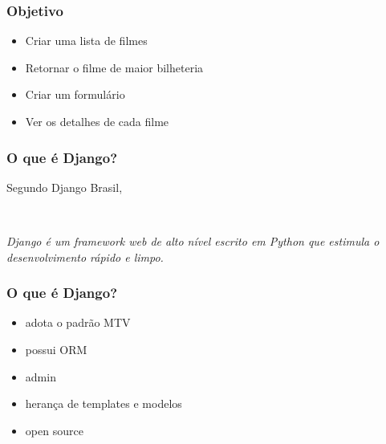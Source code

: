\documentclass[aspectratio=169]{beamer}
\begin{document}
\begin{frame}\frametitle{Objetivo}


\begin{itemize}
	\item Criar uma lista de filmes
	\item Retornar o filme de maior bilheteria
	\item Criar um formul\'ario
	\item Ver os detalhes de cada filme
\end{itemize}

\end{frame}


\begin{frame}\frametitle{O que \'e Django?}

Segundo Django Brasil,

\

\begin{exampleblock}{}
	{\it Django \'e um framework web de alto n\'ivel escrito em Python que estimula o desenvolvimento r\'apido e limpo.}
\end{exampleblock}

\end{frame}

\begin{frame}\frametitle{O que \'e Django?}

\begin{itemize}
	\item adota o padr\~ao MTV
	\item possui ORM
	\item admin
	\item heran\c ca de templates e modelos
	\item open source
\end{itemize}

\end{frame}
\end{document}
